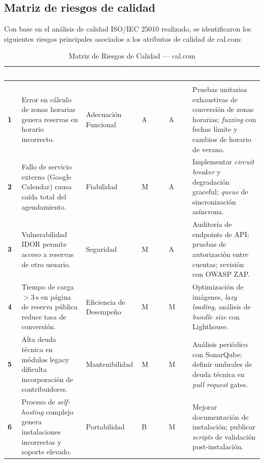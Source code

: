 \documentclass[12pt, a4paper]{article}
\newcommand{\rowpair}{\rowcolor{grisMedio}}
\newcommand{\rowimpar}{\rowcolor{grisClaro}}
\begin{document}
\subsection{Matriz de riesgos de calidad}

Con base en el análisis de calidad ISO/IEC 25010 realizado, se identificaron los
siguientes riesgos principales asociados a los atributos de calidad de cal.com:

\begin{longtable}{>{\bfseries\centering}p{0.5cm} p{3.8cm} p{2.5cm} p{1cm} p{1cm} p{4cm}}
\caption{Matriz de Riesgos de Calidad — cal.com} \label{tab:riesgos} \\
\rowcolor{azulUPA}
\textcolor{white}{\textbf{\#}} &
\textcolor{white}{\textbf{Descripción}} &
\textcolor{white}{\textbf{Atributo ISO}} &
\textcolor{white}{\textbf{Prob.}} &
\textcolor{white}{\textbf{Imp.}} &
\textcolor{white}{\textbf{Mitigación}} \\
\endfirsthead
\multicolumn{6}{c}{\tablename\ \thetable{} -- continuación} \\
\endhead
\rowpair
1 & Error en cálculo de zonas horarias genera reservas en horario incorrecto. &
Adecuación Funcional & A & A &
Pruebas unitarias exhaustivas de conversión de zonas horarias; \textit{fuzzing} con fechas límite y cambios de horario de verano. \\
\rowimpar
2 & Fallo de servicio externo (Google Calendar) causa caída total del agendamiento. &
Fiabilidad & M & A &
Implementar \textit{circuit breaker} y degradación graceful; \textit{queue} de sincronización asíncrona. \\
\rowpair
3 & Vulnerabilidad IDOR permite acceso a reservas de otro usuario. &
Seguridad & M & A &
Auditoría de endpoints de API; pruebas de autorización entre cuentas; revisión con OWASP ZAP. \\
\rowimpar
4 & Tiempo de carga $> 3\,\text{s}$ en página de reserva pública reduce tasa de conversión. &
Eficiencia de Desempeño & M & M &
Optimización de imágenes, \textit{lazy loading}, análisis de \textit{bundle size} con Lighthouse. \\
\rowpair
5 & Alta deuda técnica en módulos legacy dificulta incorporación de contribuidores. &
Mantenibilidad & M & M &
Análisis periódico con SonarQube; definir umbrales de deuda técnica en \textit{pull request} gates. \\
\rowimpar
6 & Proceso de \textit{self-hosting} complejo genera instalaciones incorrectas y soporte elevado. &
Portabilidad & B & M &
Mejorar documentación de instalación; publicar \textit{scripts} de validación post-instalación. \\
\end{longtable}
\end{document}
